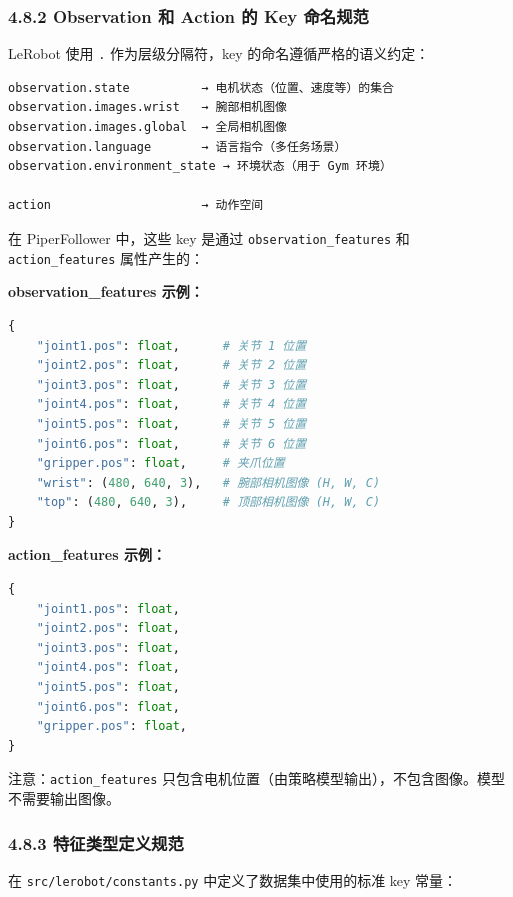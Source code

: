 \documentclass[UTF8,a4paper,11pt]{ctexart}
\begin{document}
\subsubsection{4.8.2 Observation 和 Action 的 Key 命名规范}

LeRobot 使用 \texttt{.} 作为层级分隔符，key 的命名遵循严格的语义约定：

\begin{lstlisting}[language=text]
observation.state          → 电机状态（位置、速度等）的集合
observation.images.wrist   → 腕部相机图像
observation.images.global  → 全局相机图像
observation.language       → 语言指令（多任务场景）
observation.environment_state → 环境状态（用于 Gym 环境）

action                     → 动作空间
\end{lstlisting}

在 PiperFollower 中，这些 key 是通过 \texttt{observation_features} 和 \texttt{action_features} 属性产生的：

\textbf{observation_features 示例：}

\begin{lstlisting}[language=python]
{
    "joint1.pos": float,      # 关节 1 位置
    "joint2.pos": float,      # 关节 2 位置
    "joint3.pos": float,      # 关节 3 位置
    "joint4.pos": float,      # 关节 4 位置
    "joint5.pos": float,      # 关节 5 位置
    "joint6.pos": float,      # 关节 6 位置
    "gripper.pos": float,     # 夹爪位置
    "wrist": (480, 640, 3),   # 腕部相机图像 (H, W, C)
    "top": (480, 640, 3),     # 顶部相机图像 (H, W, C)
}
\end{lstlisting}

\textbf{action_features 示例：}

\begin{lstlisting}[language=python]
{
    "joint1.pos": float,
    "joint2.pos": float,
    "joint3.pos": float,
    "joint4.pos": float,
    "joint5.pos": float,
    "joint6.pos": float,
    "gripper.pos": float,
}
\end{lstlisting}

注意：\texttt{action_features} 只包含电机位置（由策略模型输出），不包含图像。模型不需要输出图像。

\subsubsection{4.8.3 特征类型定义规范}

在 \texttt{src/lerobot/constants.py} 中定义了数据集中使用的标准 key 常量：
\end{document}
